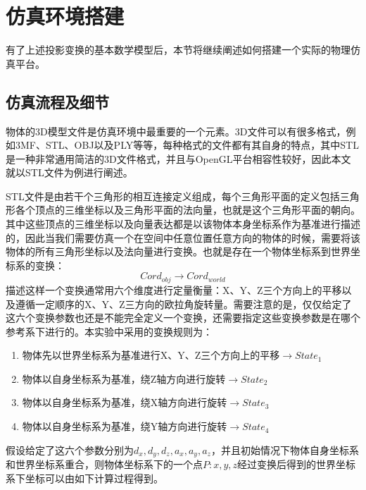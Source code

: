 \section{仿真环境搭建}
有了上述投影变换的基本数学模型后，本节将继续阐述如何搭建一个实际的物理仿真平台。
\subsection{仿真流程及细节} %
物体的3D模型文件是仿真环境中最重要的一个元素。3D文件可以有很多格式，例如3MF、STL、OBJ以及PLY等等，每种格式的文件都有其自身的特点，其中STL是一种非常通用简洁的3D文件格式，并且与OpenGL平台相容性较好，因此本文就以STL文件为例进行阐述。

STL文件是由若干个三角形的相互连接定义组成，每个三角形平面的定义包括三角形各个顶点的三维坐标以及三角形平面的法向量，也就是这个三角形平面的朝向。其中这些顶点的三维坐标以及向量表达都是以该物体本身坐标系作为基准进行描述的，因此当我们需要仿真一个在空间中任意位置任意方向的物体的时候，需要将该物体的所有三角形坐标以及法向量进行变换。也就是存在一个物体坐标系到世界坐标系的变换：
\begin{equation}
	Cord_{obj}\to Cord_{world}
\end{equation}
描述这样一个变换通常用六个维度进行定量衡量：X、Y、Z三个方向上的平移以及遵循一定顺序的X、Y、Z三方向的欧拉角旋转量。需要注意的是，仅仅给定了这六个变换参数也还是不能完全定义一个变换，还需要指定这些变换参数是在哪个参考系下进行的。本实验中采用的变换规则为：
\begin{enumerate}
\item 物体先以世界坐标系为基准进行X、Y、Z三个方向上的平移$\to State_1$
\item 物体以自身坐标系为基准，绕Z轴方向进行旋转$\to State_2$
\item 物体以自身坐标系为基准，绕X轴方向进行旋转$\to State_3$
\item 物体以自身坐标系为基准，绕Y轴方向进行旋转$\to State_4$
\end{enumerate}
假设给定了这六个参数分别为${d_x,d_y,d_z,a_x,a_y,a_z}$，并且初始情况下物体自身坐标系和世界坐标系重合，则物体坐标系下的一个点$P:{x,y,z}$经过变换后得到的世界坐标系下坐标可以由如下计算过程得到。

